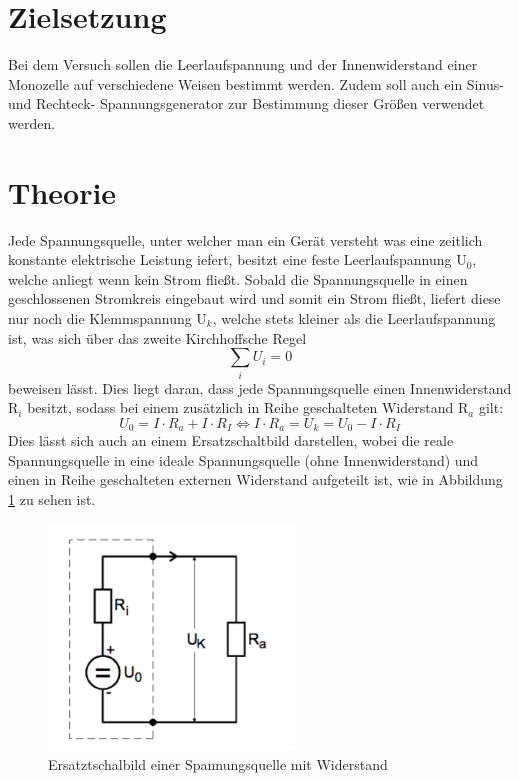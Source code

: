 \section{Zielsetzung}
Bei dem Versuch sollen die Leerlaufspannung und der Innenwiderstand einer Monozelle
auf verschiedene Weisen bestimmt werden. Zudem soll auch ein Sinus- und Rechteck-
Spannungsgenerator zur Bestimmung dieser Größen verwendet werden.

\section{Theorie}
Jede Spannungsquelle, unter welcher man ein Gerät versteht was eine zeitlich konstante
elektrische Leistung iefert, besitzt eine feste Leerlaufspannung $\text{U}_0$, welche
anliegt wenn kein Strom fließt. Sobald die Spannungsquelle in einen geschlossenen
Stromkreis eingebaut wird und somit ein Strom fließt,
liefert diese nur noch die Klemmspannung $\text{U}_k$, welche stets kleiner als
die Leerlaufspannung ist, was sich über das zweite Kirchhoffsche Regel
\begin{equation}
  \sum_i U_i = 0
\end{equation}
beweisen lässt. Dies liegt daran, dass jede Spannungsquelle einen Innenwiderstand
$\text{R}_i$ besitzt, sodass bei einem zusätzlich in Reihe geschalteten Widerstand
$\text{R}_a$ gilt:
\begin{equation}
  U_0 = I\cdot R_a + I\cdot R_I \iff I\cdot R_a = U_k = U_0 - I\cdot R_I
\end{equation}
Dies lässt sich auch an einem Ersatzschaltbild darstellen, wobei die reale
Spannungsquelle in eine ideale Spannungsquelle (ohne Innenwiderstand) und einen
in Reihe geschalteten externen Widerstand aufgeteilt ist, wie in Abbildung
\ref{fig:schalt1} zu sehen ist.
\begin{figure}[H]
  \centering
  \includegraphics[height=6cm]{schalt1.png}
  \caption{Ersatztschalbild einer Spannungsquelle mit Widerstand \cite{skript}}
  \label{fig:schalt1}
\end{figure}
